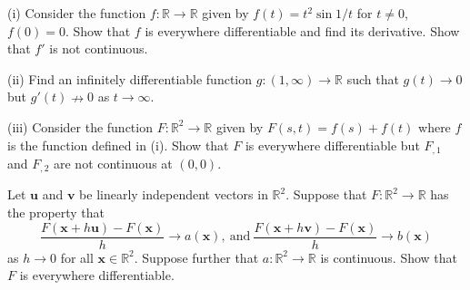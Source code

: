 \begin{question}
(i) Consider the function $f:{\mathbb R}\rightarrow{\mathbb R}$
given by $f(t)=t^{2}\sin 1/t$ for $t\neq 0$, $f(0)=0$.
Show that $f$ is everywhere differentiable and find its derivative.
Show that $f'$ is not continuous.
\noindent
[Deal quickly with the easy part and then
go back to the definition to deal with $t=0$.
There are wide selection of counter-examples
obtained by looking at $t^{\beta}\sin t^{\alpha}$
for various values of $\alpha$ and $\beta$.]

(ii) Find an infinitely differentiable
function $g:(1,\infty)\rightarrow{\mathbb R}$
such that $g(t)\rightarrow 0$ but $g'(t)\nrightarrow 0$
as $t\rightarrow\infty$.

(iii) Consider the function 
$F:{\mathbb R}^{2}\rightarrow{\mathbb R}$
given by $F(s,t)=f(s)+f(t)$ where $f$ is the function
defined in (i). Show that $F$ is everywhere differentiable
but $F_{,1}$ and $F_{,2}$ are not continuous at
$(0,0)$.

\end{question}
\begin{question}
Let $\mathbf{u}$ and $\mathbf{v}$ be linearly
independent vectors in ${\mathbb R}^{2}$.
Suppose that $F:{\mathbb R}^{2}\rightarrow{\mathbb R}$
has the property that
\[\frac{F({\mathbf x}+h{\mathbf u})-F({\mathbf x})}{h}
\rightarrow a({\mathbf x}),\ \text{and}
\ \frac{F({\mathbf x}+h{\mathbf v})-F({\mathbf x})}{h}
\rightarrow b({\mathbf x})\]
as $h\rightarrow 0$ for all ${\mathbf x}\in{\mathbb R}^{2}$.
Suppose further that $a:{\mathbb R}^{2}\rightarrow{\mathbb R}$
is continuous. Show that $F$ is everywhere differentiable.

\end{question}
